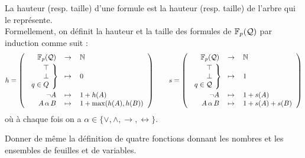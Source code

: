 		\eqskip{3mm}
		\begin{Definition}
			La hauteur (resp.\! taille) d'une formule est la hauteur (resp.\! taille) de l'arbre qui le représente. \\
			Formellement, on définit la hauteur et la taille des formules de \(\mathbb{F}_p(\mathcal{Q})\) par induction comme suit :
				\setlength{\tabcolsep}{2.2pt}
				\[
				h = \left( \!\!
				\begin{tabular}[h]{rcl}
					\(\bb{F}_p(\cal{Q})\) & \(\rightarrow\) & \(\bb{N}\) \vspace{1mm} \\
					\( \left. \begin{tabular}[h]{r}
						\(\top\) \\ \(\bot\) \\ \(q \in Q\)
					\end{tabular} \! \right\} \hspace{-1mm} \vspace{1mm} \)
					& \(\mapsto\) & \(0\) \\
					\(\neg A \) & \(\mapsto\) & \(1 + h(A)\) \\
					\raggedleft \( A \, \alpha \, B \) & \(\mapsto\) & \(1 + \max (h(A),h(B)) \)
				\end{tabular} \right)
				\qquad
				s = \left( \!\!
				\begin{tabular}[h]{rcl}
					\(\bb{F}_p(\cal{Q})\) & \(\rightarrow\) & \(\bb{N}\) \vspace{1mm} \\
					\( \left. \begin{tabular}[h]{r}
						\(\top\) \\ \(\bot\) \\ \(q \in \cal{Q}\)
					\end{tabular} \! \right\} \hspace{-1mm} \vspace{1mm} \)
					& \(\mapsto\) & \(1\) \\
					\(\neg A \) & \(\mapsto\) & \(1 + s(A)\) \\
					\raggedleft \( A \, \alpha \, B \) & \(\mapsto\) & \(1 + s(A) + s(B) \)
				\end{tabular} \right)
				\]
			où à chaque fois on a \(\alpha \in \{\vee,\wedge,\rightarrow,\leftrightarrow\}\).
		\end{Definition} \setlength{\tabcolsep}{5pt}
		
		\begin{Exercice}
			Donner de même la définition de quatre fonctions donnant les nombres et les ensembles de feuilles et de variables.
		\end{Exercice}
		
